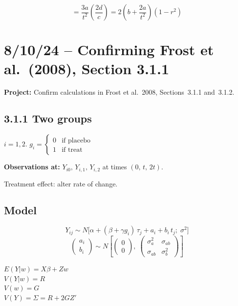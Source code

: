 \documentclass[11pt]{article}
\newcommand{\marginmark}[1]{%
  \begin{mdframed}[linewidth=0.5pt,innertopmargin=4pt,
    innerbottommargin=4pt]
  \small #1
  \end{mdframed}}
\begin{document}
\begin{equation}
  = \frac{3a}{t^2}
    \left(\frac{2d}{c}\right)
  = 2\!\left(b + \frac{2a}{t^2}\right)(1-r^2)
\end{equation}


\newpage
\section{8/10/24 -- Confirming Frost et al.\ (2008),
  Section 3.1.1}

\textbf{Project:} Confirm calculations in
Frost et al.\ 2008, Sections~3.1.1 and~3.1.2.

\subsection*{3.1.1 Two groups}

$i = 1, 2$. \quad
$g_i = \begin{cases} 0 & \text{if placebo} \\
1 & \text{if treat} \end{cases}$

\medskip\noindent
\textbf{Observations at:} $Y_{i0},\, Y_{i,1},\, Y_{i,2}$
at times $(0,\, t,\, 2t)$.

\medskip\noindent
Treatment effect: alter rate of change.

\subsection*{Model}

\begin{equation}
  Y_{ij} \sim N\!\bigl[
    \alpha + (\beta + \gamma g_i)\,\tau_j
    + a_i + b_i\,t_j;\; \sigma^2
  \bigr]
\end{equation}
\[
  \begin{pmatrix} a_i \\ b_i \end{pmatrix}
  \sim N\!\left[
    \begin{pmatrix} 0 \\ 0 \end{pmatrix},\;
    \begin{pmatrix}
      \sigma_a^2 & \sigma_{ab} \\
      \sigma_{ab} & \sigma_b^2
    \end{pmatrix}
  \right]
\]

\marginmark{%
  $E(Y|w) = X\beta + Zw$ \\
  $V(Y|w) = R$ \\
  $V(w) = G$ \\
  $V(Y) = \Sigma = R + 2GZ'$}
\end{document}
